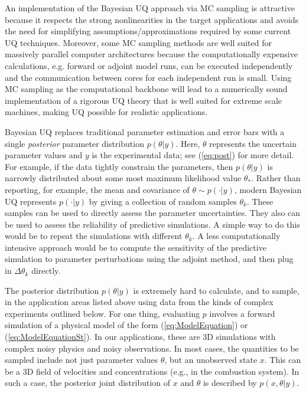 \documentclass[11pt]{article}
\begin{document}
An implementation of the Bayesian UQ approach via MC sampling
is attractive because it respects the strong nonlinearities in the target applications
and avoids the need for simplifying assumptions/approximations required by some current UQ techniques.
Moreover, some MC sampling methods are well suited for massively parallel computer
architectures because the computationally expensive calculations,
e.g. forward or adjoint model runs, can be executed independently and
the communication between cores for each independent run is small.
Using MC sampling as the computational backbone will lead to a numerically sound
implementation of a rigorous UQ theory that is well suited for extreme scale machines, making UQ possible for realistic applications.

Bayesian UQ replaces traditional parameter estimation and error bars with a single {\em posterior}
parameter distribution $p(\theta|y)$. 
Here, $\theta$ represents the uncertain parameter values and $y$ is the experimental data;
see (\ref{eq:post}) for more detail.
For example, if the data tightly constrain the parameters, then $p(\theta|y)$ is narrowly 
distributed about some most maximum likelihood value $\theta_*$.
Rather than reporting, for example, the mean and covariance of $\theta \sim p(\cdot|y)$,
modern Bayesian UQ represents $p(\cdot|y)$ by giving a collection of random samples $\theta_k$.
These samples can be used to directly assess the parameter uncertainties.
They also can be used to assess the reliability of predictive simulations.
A simple way to do this would be to repeat the simulations with different $\theta_k$.
A less computationally intensive approach would be to compute the sensitivity of the predictive 
simulation to parameter perturbations using the adjoint method, and then plug in $\Delta \theta_k$
directly.

The posterior distribution $p(\theta|y)$ is extremely hard to calculate, and to sample, in the 
application areas listed above using data from the kinds of complex experiments outlined below.
For one thing, evaluating $p$ involves a forward simulation of a physical model of the form
(\ref{eq:ModelEquation}) or (\ref{eq:ModelEquationSt}).
In our applications, these are 3D simulations with complex noisy physics and noisy observations.
In most cases, the quantities to be sampled include not just parameter values $\theta$,
but an unobserved state $x$.
This can be a 3D field of velocities and concentrations (e.g., in the combustion system).
In such a case, the posterior joint distribution of $x$ and $\theta$ is described by $p(x,\theta|y)$.
\end{document}
